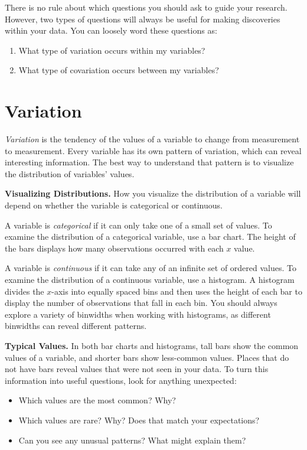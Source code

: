\documentclass{article}
\begin{document}
There is no rule about which questions you should ask to guide your research. However, two types of questions will always be useful for making discoveries within your data. You can loosely word these questions as:

\begin{enumerate}
  \item What type of variation occurs within my variables?
  \item What type of covariation occurs between my variables?
\end{enumerate}

	\section{Variation}

\textit{Variation} is the tendency of the values of a variable to change from measurement to measurement. Every variable has its own pattern of variation, which can reveal interesting information. The best way to understand that pattern is to visualize the distribution of variables’ values.

\textbf{Visualizing Distributions.} How you visualize the distribution of a variable will depend on whether the variable is categorical or continuous.

A variable is \textit{categorical} if it can only take one of a small set of values. To examine the distribution of a categorical variable, use a bar chart. The height of the bars displays how many observations occurred with each \(x\) value.

A variable is \textit{continuous} if it can take any of an infinite set of ordered values. To examine the distribution of a continuous variable, use a histogram. A histogram divides the \(x\)-axis into equally spaced bins and then uses the height of each bar to display the number of observations that fall in each bin. You should always explore a variety of binwidths when working with histograms, as different binwidths can reveal different patterns.

\textbf{Typical Values.} In both bar charts and histograms, tall bars show the common values of a variable, and shorter bars show less-common values. Places that do not have bars reveal values that were not seen in your data. To turn this information into useful questions, look for anything unexpected:

\begin{itemize}
	\item Which values are the most common? Why?
	\item Which values are rare? Why? Does that match your expectations?
	\item Can you see any unusual patterns? What might explain them?
\end{itemize}
\end{document}
